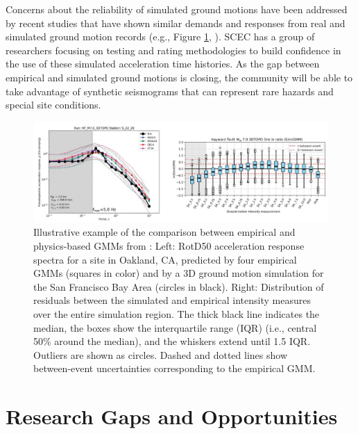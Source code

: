 Concerns about the reliability of simulated ground motions have been addressed by recent studies that have shown similar demands and responses from real and simulated ground motion records (e.g., Figure \ref{fig:haz_EmpricalVsSimulated}, \cite{galasso2013validation, rodgers2019broadband}). SCEC has a group of researchers focusing on testing and rating methodologies to build confidence in the use of these simulated acceleration time histories. As the gap between empirical and simulated ground motions is closing, the community will be able to take advantage of synthetic seismograms that can represent rare hazards and special site conditions.

\begin{figure}[htb]
    \centering
    \includegraphics[width=1.0\textwidth, angle = 0]{Figures/EmpiricalVsSimulated.png}
    \caption{Illustrative example of the comparison between empirical and physics-based GMMs from \citep{rodgers2019broadband}: Left: RotD50 acceleration response spectra for a site in Oakland, CA, predicted by four empirical GMMs (squares in color) and by a 3D ground motion simulation for the San Francisco Bay Area (circles in black). Right: Distribution of residuals between the simulated and empirical intensity measures over the entire simulation region. The thick black line indicates the median, the boxes show the interquartile range (IQR) (i.e., central 50\% around the median), and the whiskers extend until 1.5 IQR. Outliers are shown as circles. Dashed and dotted lines show between-event uncertainties corresponding to the empirical GMM.}
    \label{fig:haz_EmpricalVsSimulated}
\end{figure}

\section{Research Gaps and Opportunities}
\label{sec:eq_shake_gaps}

